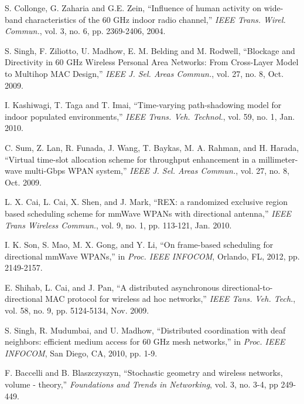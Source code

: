 \documentclass[10pt, conference, letterpaper]{IEEEtran}
\newcommand*{\Rom}[1]{\uppercase\expandafter{\romannumeral #1\relax}} %
\begin{document}
\begin{thebibliography}{50}
S. Collonge, G. Zaharia and G.E. Zein, ``Influence of human activity on wide-band characteristics of the 60 GHz indoor radio channel,'' \emph{IEEE Trans. Wirel. Commun.}, vol. 3,  no. 6, pp. 2369-2406, 2004.

S. Singh, F. Ziliotto, U. Madhow, E. M. Belding and M. Rodwell, ``Blockage and Directivity in 60 GHz Wireless Personal Area Networks: From Cross-Layer Model to Multihop MAC Design,'' \emph{IEEE J. Sel. Areas Commun.}, vol. 27, no. 8, Oct. 2009.

I. Kashiwagi, T. Taga and T. Imai, ``Time-varying path-shadowing model for indoor populated environments,'' \emph{IEEE Trans. Veh. Technol.}, vol. 59, no. 1, Jan. 2010.

C. Sum, Z. Lan, R. Funada, J. Wang, T. Baykas, M. A. Rahman, and H. Harada, ``Virtual time-slot allocation scheme for throughput enhancement in a millimeter-wave multi-Gbps WPAN system,'' \emph{IEEE J. Sel. Areas Commun.}, vol. 27, no. 8, Oct. 2009.

L. X. Cai, L. Cai, X. Shen, and J. Mark, ``REX: a randomized exclusive region based scheduling scheme for mmWave WPANs with directional antenna,'' \emph{IEEE Trans Wireless Commun.}, vol. 9, no. 1, pp. 113-121, Jan. 2010. 

I. K. Son, S. Mao, M. X. Gong, and Y. Li, ``On frame-based scheduling for directional mmWave WPANs,'' in \emph{Proc. IEEE INFOCOM}, Orlando, FL, 2012, pp. 2149-2157.

E. Shihab, L. Cai, and J. Pan, ``A distributed asynchronous directional-to-directional MAC protocol for wireless ad hoc networks,'' \emph{IEEE Tans. Veh. Tech.}, vol. 58, no. 9, pp. 5124-5134, Nov. 2009. 

S. Singh, R. Mudumbai, and U. Madhow, ``Distributed coordination with deaf neighbors: efficient medium access for 60 GHz mesh networks,'' in \emph{Proc. IEEE INFOCOM}, San Diego, CA, 2010, pp. 1-9.

F. Baccelli and B. Blaszczyszyn, ``Stochastic geometry and wireless networks, volume \Rom{1} - theory,'' \emph{Foundations and Trends in Networking}, vol. 3, no. 3-4, pp 249-449.




\end{thebibliography}
\end{document}
